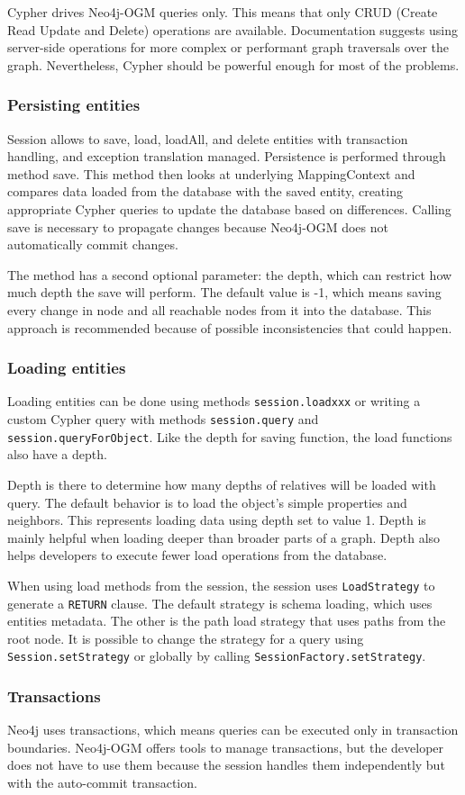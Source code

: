 Cypher drives Neo4j-OGM queries only. This means that only CRUD (Create Read Update and Delete) operations are available. Documentation suggests using server-side operations for more complex or performant graph traversals over the graph. Nevertheless, Cypher should be powerful enough for most of the problems.

\subsubsection {Persisting entities}

Session allows to save, load, loadAll, and delete entities with transaction handling, and exception translation managed. Persistence is performed through method save. This method then looks at underlying MappingContext and compares data loaded from the database with the saved entity, creating appropriate Cypher queries to update the database based on differences. Calling save is necessary to propagate changes because Neo4j-OGM does not automatically commit changes.

The method has a second optional parameter: the depth, which can restrict how much depth the save will perform. The default value is -1, which means saving every change in node and all reachable nodes from it into the database. This approach is recommended because of possible inconsistencies that could happen.

\subsubsection {Loading entities}

Loading entities can be done using methods \texttt{session.loadxxx} or writing a custom Cypher query with methods \texttt{session.query} and \texttt{session.queryForObject}.
Like the depth for saving function, the load functions also have a depth.

Depth is there to determine how many depths of relatives will be loaded with query. The default behavior is to load the object's simple properties and neighbors.
This represents loading data using depth set to value 1. Depth is mainly helpful when loading deeper than broader parts of a graph. Depth also helps developers to
execute fewer load operations from the database.

When using load methods from the session, the session uses \texttt{LoadStrategy} to generate a \texttt{RETURN} clause. The default strategy is schema loading,
which uses entities metadata. The other is the path load strategy that uses paths from the root node. It is possible to change the strategy for a query using \texttt{Session.setStrategy}
or globally by calling \texttt{SessionFactory.setStrategy}.

\subsubsection{Transactions}

Neo4j uses transactions, which means queries can be executed only in transaction boundaries. Neo4j-OGM offers tools to manage transactions, but the developer does not have to use them because the session handles them independently but with the auto-commit transaction.
